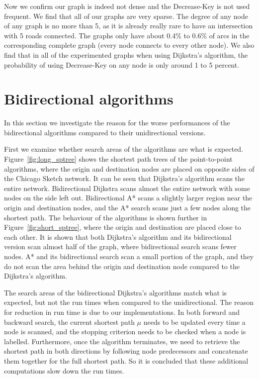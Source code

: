 Now we confirm our graph is indeed not dense and the Decrease-Key is not used frequent.
We find that all of our graphs are very sparse.
The degree of any node of any graph is no more than 5,
as it is already really rare to have an intersection with 5 roads connected.
The graphs only have about 0.4\% to 0.6\% of arcs in the corresponding complete graph (every node connects to every other node).
We also find that in all of the experimented graphs when using Dijkstra's algorithm,
the probability of using Decrease-Key on any node is only around 1 to 5 percent.

\section{Bidirectional algorithms}
In this section we investigate the reason for the worse performances of the bidirectional algorithms compared to their unidirectional versions. 

First we examine whether search areas of the algorithms are what is expected.
Figure~\ref{fig:long_sptree} shows the shortest path trees of the point-to-point algorithms, 
where the origin and destination nodes are placed on opposite sides of the Chicago Sketch network.
It can be seen that Dijkstra's algorithm scans the entire network.
Bidirectional Dijkstra scans almost the entire network with some nodes on the side left out.
Bidirectional A* scans a slightly larger region near the origin and destination nodes,
and the A* search scans just a few nodes along the shortest path.
The behaviour of the algorithms is shown further in Figure~\ref{fig:short_sptree},
where the origin and destination are placed close to each other.
It is shown that both Dijkstra's algorithm and its bidirectional version scan almost half of the graph,
where bidirectional search scans fewer nodes.
A* and its bidirectional search scan a small portion of the graph,
and they do not scan the area behind the origin and destination node compared to the Dijkstra's algorithm.

The search areas of the bidirectional Dijkstra's algorithms match what is expected,
but not the run times when compared to the unidirectional.
The reason for reduction in run time is due to our implementations.
In both forward and backward search,
the current shortest path $\mu$ needs to be updated every time a node is scanned,
and the stopping criterion needs to be checked when a node is labelled.
Furthermore,
once the algorithm terminates,
we need to retrieve the shortest path in both directions by following node predecessors and concatenate them together for the full shortest path.
So it is concluded that these additional computations slow down the run times.

